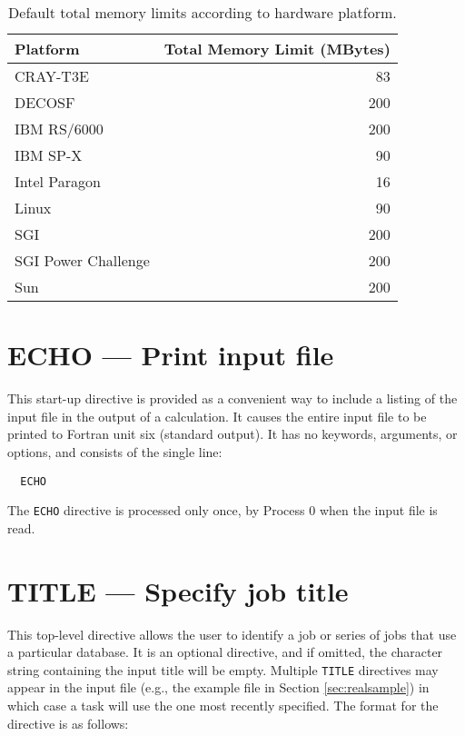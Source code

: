 
\begin{table}

\center

\label{tbl:default-memory-limits}

\begin{tabular}{lr}
\hline\hline
Platform        & Total Memory Limit (MBytes) \\
\hline
CRAY-T3E        & 83 \\
DECOSF          & 200 \\
IBM RS/6000     & 200 \\
IBM SP-X        & 90 \\
Intel Paragon   & 16 \\
Linux           & 90 \\
SGI             & 200 \\
SGI Power Challenge  & 200 \\
Sun             & 200 \\
\hline\hline
\end{tabular}

\caption{Default total memory limits according to hardware platform.}


\end{table}

\section{ECHO --- Print input file}
\label{sec:echo}

This start-up directive is provided as a convenient way to include a
listing of the input file in the output of a calculation.  It causes
the entire input file to be printed to Fortran unit six (standard
output).  It has no keywords, arguments, or options, and consists of
the single line:

\begin{verbatim}
  ECHO
\end{verbatim}

The \verb+ECHO+ directive is processed only
once, by Process 0 when the input file is read.

\section{TITLE --- Specify job title}

This top-level directive allows the user to identify a job or series
of jobs that use a particular database.  It is an optional directive,
and if omitted, the character string containing the input title will
be empty.  Multiple {\tt TITLE} directives may appear in the input
file (e.g., the example file in Section \ref{sec:realsample}) in which
case a task will use the one most recently specified.  The format for
the directive is as follows:


